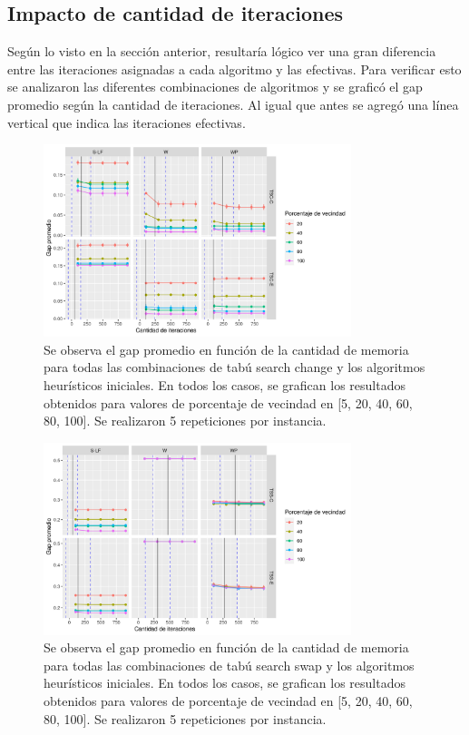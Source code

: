 \subsection{Impacto de cantidad de iteraciones}

Según lo visto en la sección anterior, resultaría lógico ver una gran diferencia entre las iteraciones asignadas a cada algoritmo y las efectivas. Para verificar esto se analizaron las diferentes combinaciones de algoritmos y se graficó el gap promedio según la cantidad de iteraciones. Al igual que antes se agregó una línea vertical que indica las iteraciones efectivas.

\begin{figure}[H]
    \centering
    \includegraphics[width=0.8\textwidth]{plots/iteraciones_tsc.png}
    \caption{Se observa el gap promedio en función de la cantidad de memoria para todas las combinaciones de tabú search change y los algoritmos heurísticos iniciales. En todos los casos, se grafican los resultados obtenidos para valores de porcentaje de vecindad en [5, 20, 40, 60, 80, 100]. Se realizaron 5 repeticiones por instancia.}
    \label{plot:iteraciones tsc}
\end{figure}

\begin{figure}[H]
    \centering
    \includegraphics[width=0.8\textwidth]{plots/iteraciones_tss.png}
    \caption{Se observa el gap promedio en función de la cantidad de memoria para todas las combinaciones de tabú search swap y los algoritmos heurísticos iniciales. En todos los casos, se grafican los resultados obtenidos para valores de porcentaje de vecindad en [5, 20, 40, 60, 80, 100]. Se realizaron 5 repeticiones por instancia.}
    \label{plot:iteraciones tss}
\end{figure}

